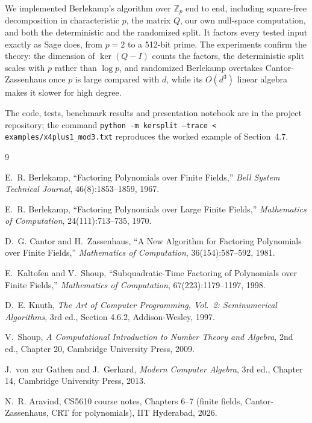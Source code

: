 \documentclass[11pt,a4paper]{article}
\newcommand{\Zp}{\mathbb{Z}_p}
\begin{document}
We implemented Berlekamp's algorithm over $\Zp$ end to end, including square-free decomposition
in characteristic $p$, the matrix $Q$, our own null-space computation, and both the deterministic
and the randomized split. It factors every tested input exactly as Sage does, from $p = 2$ to a
512-bit prime. The experiments confirm the theory: the dimension of $\ker(Q - I)$ counts the
factors, the deterministic split scales with $p$ rather than $\log p$, and randomized Berlekamp
overtakes Cantor-Zassenhaus once $p$ is large compared with $d$, while its $O(d^3)$ linear algebra
makes it slower for high degree.

The code, tests, benchmark results and presentation notebook are in the project repository; the
command \texttt{python -m kersplit --trace < examples/x4plus1\_mod3.txt} reproduces the worked
example of Section~4.7.

\begingroup
\footnotesize
\setlength{\parskip}{0pt}

\begin{thebibliography}{9}
\setlength{\itemsep}{1pt}
\setlength{\parsep}{0pt}

E.~R. Berlekamp,
``Factoring Polynomials over Finite Fields,''
\emph{Bell System Technical Journal}, 46(8):1853--1859, 1967.

E.~R. Berlekamp,
``Factoring Polynomials over Large Finite Fields,''
\emph{Mathematics of Computation}, 24(111):713--735, 1970.

D.~G. Cantor and H.~Zassenhaus,
``A New Algorithm for Factoring Polynomials over Finite Fields,''
\emph{Mathematics of Computation}, 36(154):587--592, 1981.

E.~Kaltofen and V.~Shoup,
``Subquadratic-Time Factoring of Polynomials over Finite Fields,''
\emph{Mathematics of Computation}, 67(223):1179--1197, 1998.

D.~E. Knuth,
\emph{The Art of Computer Programming, Vol.~2: Seminumerical Algorithms}, 3rd ed., Section 4.6.2,
Addison-Wesley, 1997.

V.~Shoup,
\emph{A Computational Introduction to Number Theory and Algebra}, 2nd ed., Chapter 20,
Cambridge University Press, 2009.

J.~von zur Gathen and J.~Gerhard,
\emph{Modern Computer Algebra}, 3rd ed., Chapter 14, Cambridge University Press, 2013.

N.~R. Aravind,
CS5610 course notes, Chapters 6--7 (finite fields, Cantor-Zassenhaus, CRT for polynomials),
IIT Hyderabad, 2026.

\end{thebibliography}
\endgroup
\end{document}
